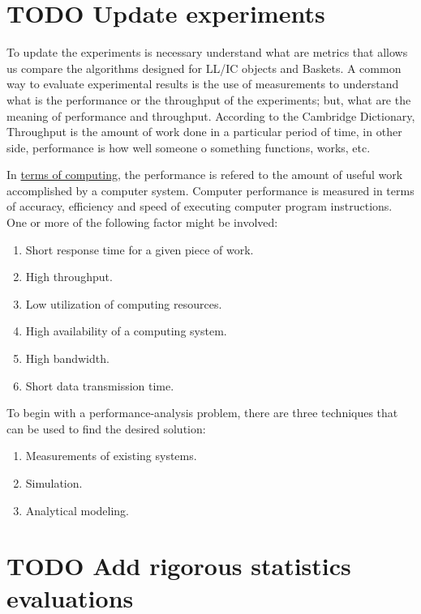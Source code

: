 \documentclass[openany, a4paper]{book}
\theoremstyle{break}
\theoremstyle{example}
\theoremstyle{note}
\theoremstyle{break}
\theoremstyle{exercise}
\begin{document}
\section{{\bfseries\sffamily TODO} Update experiments}
\label{sec:org37d3f34}

To update the experiments is necessary understand what are metrics that
allows us compare the algorithms designed for LL/IC objects and
Baskets. A common way to evaluate experimental results is the use of
measurements to understand what is the performance or the throughput of the
experiments; but, what are the meaning of performance and
throughput. According to the Cambridge Dictionary,
Throughput is the amount of work done in a particular period of time,
in other side, performance is how well someone o something functions, works,
etc.

In \href{https://en.wikipedia.org/wiki/Computer\_performance}{terms of computing}, the performance is refered to the amount of
useful work accomplished by a computer system. Computer performance is
measured in terms of accuracy, efficiency and speed of executing computer
program instructions. One or more of the following factor might be involved:

\begin{enumerate}
\item Short response time for a given piece of work.
\item High throughput.
\item Low utilization of computing resources.
\item High availability of a computing system.
\item High bandwidth.
\item Short data transmission time.
\end{enumerate}

To begin with a performance-analysis problem, there are three techniques
that can be used to find the desired solution:

\begin{enumerate}
\item Measurements of existing systems.
\item Simulation.
\item Analytical modeling.
\end{enumerate}





\section{{\bfseries\sffamily TODO} Add rigorous statistics evaluations}
\label{sec:org2c6526c}
\end{document}
